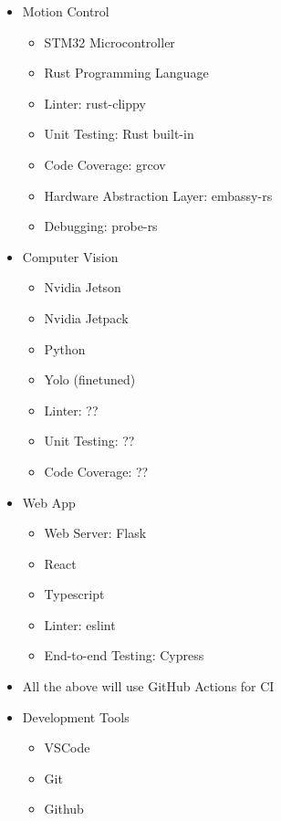 \documentclass{article}
\begin{document}
\begin{itemize}
  \item Motion Control
        \begin{itemize}
          \item STM32 Microcontroller
          \item Rust Programming Language
          \item Linter: rust-clippy
          \item Unit Testing: Rust built-in
          \item Code Coverage: grcov
          \item Hardware Abstraction Layer: embassy-rs
          \item Debugging: probe-rs
        \end{itemize}
  \item Computer Vision
        \begin{itemize}
          \item Nvidia Jetson
          \item Nvidia Jetpack
          \item Python
          \item Yolo (finetuned)
          \item Linter: ??
          \item Unit Testing: ??
          \item Code Coverage: ??
        \end{itemize}
  \item Web App
        \begin{itemize}
          \item Web Server: Flask
          \item React
          \item Typescript
          \item Linter: eslint
          \item End-to-end Testing: Cypress
        \end{itemize}
  \item All the above will use GitHub Actions for CI
  \item Development Tools
        \begin{itemize}
          \item VSCode
          \item Git
          \item Github
        \end{itemize}
\end{itemize}
\end{document}
